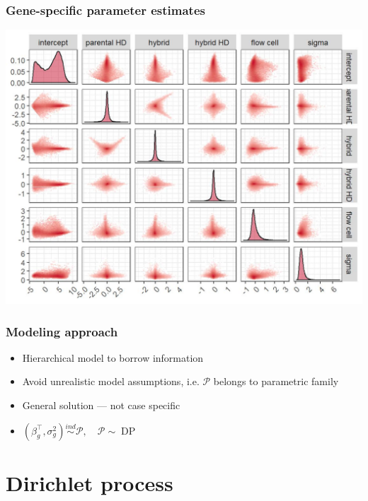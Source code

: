 \documentclass{beamer}
\newcommand{\op}{\operatorname}
\newcommand{\ind}{\stackrel{ind}{\sim}}
\begin{document}
\begin{frame}%
  \frametitle{Gene-specific parameter estimates}
  {\centering
    \includegraphics[width=.8\textwidth]{pairs1}\\
  }
\end{frame}

\begin{frame}%
  \frametitle{Modeling approach}
  \begin{itemize}
           \item Hierarchical model to borrow information
    \pause \item Avoid unrealistic model assumptions, i.e. $\mathcal{P}$ belongs to parametric family
    \pause \item General solution --- not case specific
    \pause \item $(\beta_g^\top,\sigma^2_g) \ind \mathcal{P},\quad \mathcal{P} \sim \op{DP}$
  \end{itemize}
\end{frame}

\section[DP intro]{Dirichlet process}
\end{document}
